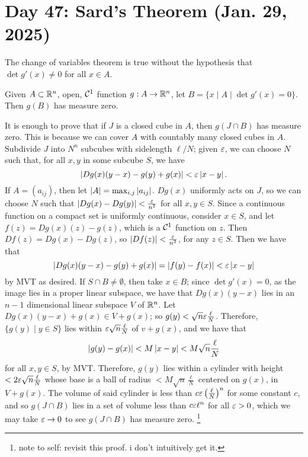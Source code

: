 \section{Day 47: Sard's Theorem (Jan. 29, 2025)}
The change of variables theorem is true without the hypothesis that $\det g'(x) \neq 0$ for all $x \in A$.
\begin{simplethm}
    Given $A \subset \mathbb R^n$, open, $\mathcal C^1$ function $g : A \to \mathbb R^n$, let $B = \{ x \mid A \mid \det g'(x) = 0\}$. Then $g(B)$ has measure zero.
\end{simplethm}
\noindent It is enough to prove that if $J$ is a closed cube in $A$, then $g(J \cap B)$ has measure zero. This is because we can cover $A$ with countably many closed cubes in $A$. Subdivide $J$ into $N^n$ subcubes with sidelength $\ell/N$; given $\varepsilon$, we can choose $N$ such that, for all $x, y$ in some subcube $S$, we have
\[ \left\lvert Dg(x)(y - x) - g(y) + g(x) \right\rvert < \varepsilon \left\lvert x - y \right\rvert. \]
If $A = (a_{ij})$, then let $\left\lvert A \right\rvert = \max_{i,j} \left\lvert a_{ij} \right\rvert$. $Dg(x)$ uniformly acts on $J$, so we can choose $N$ such that $\left\lvert Dg(x) - Dg(y) \right\rvert < \frac{\varepsilon}{n^2}$ for all $x, y \in S$. Since a continuous function on a compact set is uniformly continuous, consider $x \in S$, and let $f(z) = Dg(x)(z) - g(z)$, which is a $\mathcal C^1$ function on $z$. Then $Df(z) = Dg(x) - Dg(z)$, so $\left\lvert Df(z) \right\rvert < \frac{\varepsilon}{n^2}$, for any $z \in S$. Then we have that
\[ \left\lvert Dg(x)(y - x) - g(y) + g(x) \right\rvert = \left\lvert f(y) - f(x) \right\rvert < \varepsilon \left\lvert x - y \right\rvert \]
by MVT as desired. If $S \cap B \neq \emptyset$, then take $x \in B$; since $\det g'(x) = 0$, as the image lies in a proper linear subspace, we have that $Dg(x)(y-x)$ lies in an $n-1$ dimensional linear subspace $V$ of $\mathbb R^n$. Let $Dg(x)(y-x) + g(x) \in V + g(x)$; so $g(y) < \sqrt{n} \varepsilon \frac{\ell}{N}$. Therefore, $\{ g(y) \mid y \in S \}$ lies within $\varepsilon \sqrt{n} \frac{\ell}{N}$ of $v + g(x)$, and we have that
\[ \left\lvert g(y) - g(x) \right\rvert < M \left\lvert x - y \right\rvert < M \sqrt{n} \frac{\ell}{N} \]
for all $x, y \in S$, by MVT. Therefore, $g(y)$ lies within a cylinder with height $< 2 \varepsilon \sqrt{n} \frac{\ell}{N}$ whose base is a ball of radius $< M \sqrt{n} \frac{\ell}{N}$ centered on $g(x)$, in $V + g(x)$. The volume of said cylinder is less than $c \varepsilon \left(\frac{\ell}{N}\right)^n$ for some constant $c$, and so $g(J \cap B)$ lies in a set of volume less than $c \varepsilon \ell^n$ for all $\varepsilon > 0$, which we may take $\varepsilon \to 0$ to see $g(J \cap B)$ has measure zero. \footnote{note to self: revisit this proof. i don't intuitively get it.}